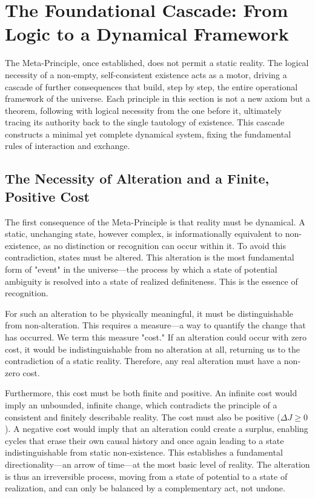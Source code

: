 \documentclass[11pt,a4paper]{article}
\begin{document}
\section{The Foundational Cascade: From Logic to a Dynamical Framework}

The Meta-Principle, once established, does not permit a static reality. The logical necessity of a non-empty, self-consistent existence acts as a motor, driving a cascade of further consequences that build, step by step, the entire operational framework of the universe. Each principle in this section is not a new axiom but a theorem, following with logical necessity from the one before it, ultimately tracing its authority back to the single tautology of existence. This cascade constructs a minimal yet complete dynamical system, fixing the fundamental rules of interaction and exchange.

\subsection{The Necessity of Alteration and a Finite, Positive Cost}
The first consequence of the Meta-Principle is that reality must be dynamical. A static, unchanging state, however complex, is informationally equivalent to non-existence, as no distinction or recognition can occur within it. To avoid this contradiction, states must be altered. This alteration is the most fundamental form of "event" in the universe—the process by which a state of potential ambiguity is resolved into a state of realized definiteness. This is the essence of recognition.

For such an alteration to be physically meaningful, it must be distinguishable from non-alteration. This requires a measure—a way to quantify the change that has occurred. We term this measure "cost." If an alteration could occur with zero cost, it would be indistinguishable from no alteration at all, returning us to the contradiction of a static reality. Therefore, any real alteration must have a non-zero cost.

Furthermore, this cost must be both finite and positive. An infinite cost would imply an unbounded, infinite change, which contradicts the principle of a consistent and finitely describable reality. The cost must also be positive (\(\Delta J \ge 0\)). A negative cost would imply that an alteration could create a surplus, enabling cycles that erase their own causal history and once again leading to a state indistinguishable from static non-existence. This establishes a fundamental directionality—an arrow of time—at the most basic level of reality. The alteration is thus an irreversible process, moving from a state of potential to a state of realization, and can only be balanced by a complementary act, not undone.
\end{document}
